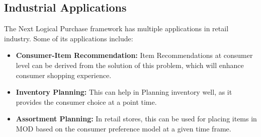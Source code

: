 \subsection{Industrial Applications}
The Next Logical Purchase framework has multiple applications in retail industry. Some of its applications 
include:
\begin{itemize}
\item {\bf Consumer-Item Recommendation:} Item Recommendations at consumer level can be derived from the 
solution of this problem, which will enhance consumer shopping experience.
\item {\bf Inventory Planning:} This can help in Planning inventory well, as it provides the 
consumer choice at a point time.
\item {\bf Assortment Planning:} In retail stores, this can be used for placing items in MOD based on the 
consumer preference model at a given time frame.
\end{itemize}
